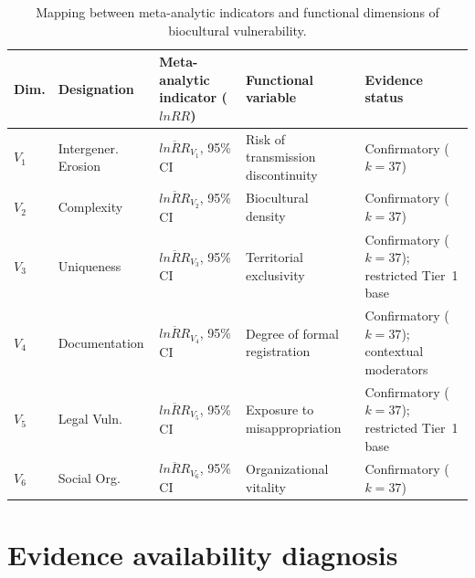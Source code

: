 \documentclass[12pt,a4paper]{article}
\begin{document}
\begin{table}[H]
\caption{Mapping between meta-analytic indicators and functional dimensions of biocultural vulnerability.}
\label{tab:mapping}
\centering
\small
\begin{tabular}{p{0.8cm}p{2.0cm}p{3.5cm}p{2.5cm}p{3.0cm}}
\toprule
\textbf{Dim.} & \textbf{Designation} & \textbf{Meta-analytic indicator ($lnRR$)} & \textbf{Functional variable} & \textbf{Evidence status} \\
\midrule
$V_1$ & Intergener. Erosion & $\overline{lnRR}_{V_1}$, 95\% CI & Risk of transmission discontinuity & Confirmatory ($k = 37$) \\
$V_2$ & Complexity & $\overline{lnRR}_{V_2}$, 95\% CI & Biocultural density & Confirmatory ($k = 37$) \\
$V_3$ & Uniqueness & $\overline{lnRR}_{V_3}$, 95\% CI & Territorial exclusivity & Confirmatory ($k = 37$); restricted Tier~1 base \\
$V_4$ & Documentation & $\overline{lnRR}_{V_4}$, 95\% CI & Degree of formal registration & Confirmatory ($k = 37$); contextual moderators \\
$V_5$ & Legal Vuln. & $\overline{lnRR}_{V_5}$, 95\% CI & Exposure to misappropriation & Confirmatory ($k = 37$); restricted Tier~1 base \\
$V_6$ & Social Org. & $\overline{lnRR}_{V_6}$, 95\% CI & Organizational vitality & Confirmatory ($k = 37$) \\
\bottomrule
\end{tabular}
\end{table}

\newpage

\section{Evidence availability diagnosis}
\label{app:viability}
\end{document}
